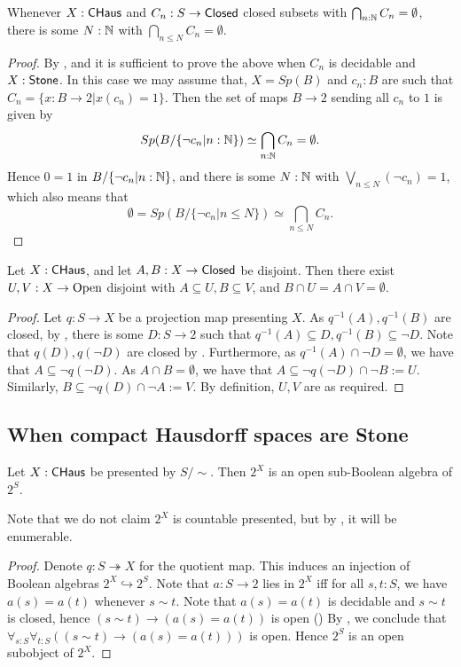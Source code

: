\begin{lemma}\label{CHausFiniteIntersectionProperty}
  Whenever $X:\mathsf{CHaus}$ and $C_n:S\to \mathsf{Closed}$ closed subsets with $\bigcap_{n:\mathbb{N}} C_n =\emptyset$, there is some $N:\mathbb{N}$ 
  with $\bigcap_{n\leq N} C_n  = \emptyset$. 
\end{lemma}
\begin{proof}
  By , and  
  it is sufficient to prove the above when $C_n$ is decidable and $X:\mathsf{Stone}$.
  In this case we may assume that, 
  $X=Sp(B)$ and $c_n:B$ are such that $C_n = \{x:B\to 2 | x(c_n) = 1\}$. 
  Then the set of maps $B\to 2$ sending all $c_n$ to $1$ is given by 
  $$Sp(B/\{\neg c_n |n:\mathbb{N}\}) \simeq \bigcap_{n:\mathbb{N}} C_n = \emptyset .$$
  Hence 
  $0=1$ in $B/\{\neg c_n|{n:\mathbb{N}}\}$, and there is some $N:\mathbb{N}$ with 
  $\bigvee_{n\leq N} (\neg c_n) = 1$, which also means that 
  $$\emptyset = Sp(B/\{ \neg c_n| n \leq N\})  \simeq \bigcap_{n\leq N} C_n .$$
\end{proof}

\begin{lemma}\label{CHausSeperationOfClosedByOpens}
  Let $X:\mathsf{CHaus}$, and let $A,B:X\to \mathsf{Closed}$ be disjoint. 
  Then there exist $U,V:X\to \mathrm{Open}$ disjoint with $A\subseteq U, B\subseteq V$, 
  and $B\cap U = A \cap V = \emptyset$. 
\end{lemma}
\begin{proof}
  Let $q:S\to X$ be a projection map presenting $X$.
  As $q^{-1}(A), q^{-1}(B)$ are closed, 
  by , there is some $D:S \to 2$ such that
  $q^{-1}(A) \subseteq D, q^{-1}(B) \subseteq \neg D$. 
  Note that $q(D), q(\neg D)$ are closed by . 
  Furthermore, as $q^{-1}(A) \cap \neg D  =\emptyset$, we have that 
  $A\subseteq \neg q (\neg D)$. As $A\cap B = \emptyset$, we have that 
  $A\subseteq \neg q (\neg D) \cap \neg B:= U$.
  Similarly, $B\subseteq \neg  q (D) \cap \neg A:= V$. 
  By definition, $U,V$ are as required. 
\end{proof}

\subsection{When compact Hausdorff spaces are Stone}\label{ConnectedComponent}
\begin{lemma}
  Let $X:\mathsf{CHaus}$ be presented by $S/\sim$. 
  Then $2^X$ is an open sub-Boolean algebra of $2^S$. 
\end{lemma}
Note that we do not claim $2^X$ is countable presented, 
but by , it will be enumerable. 
\begin{proof}
  Denote $q:S \twoheadrightarrow X$ for the quotient map. 
  This induces an injection of Boolean algebras $2^X \hookrightarrow 2^S$.
  Note that $a:S\to 2$ lies in $2^X$ iff for all $s,t:S$, we have $a(s) = a(t)$ whenever $s\sim t$.
  Note that $a(s) = a(t)$ is decidable and $s\sim t$ is closed, hence 
  $(s\sim t) \to (a(s) = a(t))$ is open ()
  By , we conclude that 
  $\forall_{s:S} \forall_{t:S} ((s\sim t) \to (a(s) = a(t)))$ is open. 
  Hence $2^S$ is an open subobject of $2^X$. 
\end{proof}

